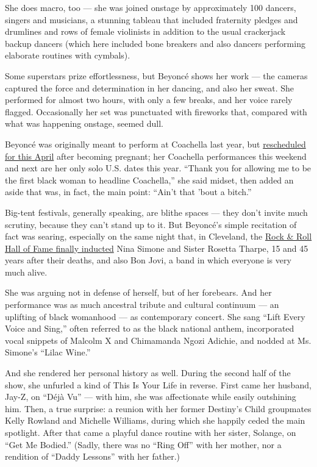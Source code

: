 She does macro, too --- she was joined onstage by approximately 100
dancers, singers and musicians, a stunning tableau that included
fraternity pledges and drumlines and rows of female violinists in
addition to the usual crackerjack backup dancers (which here included
bone breakers and also dancers performing elaborate routines with
cymbals).

Some superstars prize effortlessness, but Beyoncé shows her work --- the
cameras captured the force and determination in her dancing, and also
her sweat. She performed for almost two hours, with only a few breaks,
and her voice rarely flagged. Occasionally her set was punctuated with
fireworks that, compared with what was happening onstage, seemed dull.

Beyoncé was originally meant to perform at Coachella last year, but
\href{https://www.nytimes.com/2017/02/23/arts/music/beyonce-coachella-cancel-pregnant.html}{rescheduled
for this April} after becoming pregnant; her Coachella performances this
weekend and next are her only solo U.S. dates this year. ``Thank you for
allowing me to be the first black woman to headline Coachella,'' she
said midset, then added an aside that was, in fact, the main point:
``Ain't that 'bout a bitch.''

Big-tent festivals, generally speaking, are blithe spaces --- they don't
invite much scrutiny, because they can't stand up to it. But Beyoncé's
simple recitation of fact was searing, especially on the same night
that, in Cleveland, the
\href{https://www.nytimes.com/2017/12/13/arts/music/rock-roll-hall-fame-bon-jovi-nina-simone-cars.html}{Rock
\& Roll Hall of Fame finally inducted} Nina Simone and Sister Rosetta
Tharpe, 15 and 45 years after their deaths, and also Bon Jovi, a band in
which everyone is very much alive.

She was arguing not in defense of herself, but of her forebears. And her
performance was as much ancestral tribute and cultural continuum --- an
uplifting of black womanhood --- as contemporary concert. She sang
``Lift Every Voice and Sing,'' often referred to as the black national
anthem, incorporated vocal snippets of Malcolm X and Chimamanda Ngozi
Adichie, and nodded at Ms. Simone's ``Lilac Wine.''

And she rendered her personal history as well. During the second half of
the show, she unfurled a kind of This Is Your Life in reverse. First
came her husband, Jay-Z, on ``Déjà Vu'' --- with him, she was
affectionate while easily outshining him. Then, a true surprise: a
reunion with her former Destiny's Child groupmates Kelly Rowland and
Michelle Williams, during which she happily ceded the main spotlight.
After that came a playful dance routine with her sister, Solange, on
``Get Me Bodied.'' (Sadly, there was no ``Ring Off'' with her mother,
nor a rendition of ``Daddy Lessons'' with her father.)

